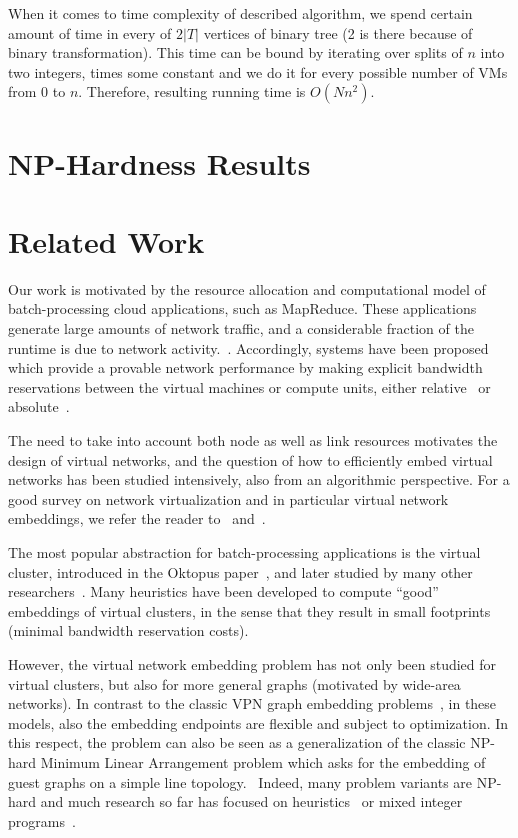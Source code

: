 \documentclass[9pt,twocolumn]{scrartcl}
\begin{document}
When it comes to time complexity of described algorithm, we spend
certain amount of time in every of $2|T|$ vertices of binary
tree (2 is there because of binary transformation). This time can be
bound by iterating over splits of $n$ into two integers, times some
constant and we do it for every possible number of VMs from $0$ to $n$. Therefore, resulting running time is $O(Nn^2)$.



\section{NP-Hardness Results}\label{sec:np}




\section{Related Work}\label{sec:relwork}

Our work is motivated by the resource allocation and computational model of
batch-processing cloud applications, such as MapReduce.
These applications
generate large amounts of network traffic, and a considerable
fraction of the runtime is due to network acti\-vi\-ty.~\cite{talk-about,amazonbw,orchestra}.
Accordingly, systems have been proposed which provide
a provable network performance by making explicit bandwidth reservations
between the virtual machines or compute units, either relative~\cite{seawall,faircloud,elasticswitch}
or absolute~\cite{secondnet,oktopus, proteus, drl, gatekeeper}.

The need to take into account both node as well as link resources motivates
the design of virtual networks, and the question of how to efficiently embed virtual networks
has been studied intensively, also from an algorithmic perspective.
For a good survey on network virtualization and in particular virtual network embeddings,
we refer the reader to~\cite{boutaba-survey} and~\cite{fischer-survey}.

The most popular abstraction for batch-processing applications is the virtual cluster,
introduced in the Oktopus paper~\cite{oktopus}, and later studied by many other researchers~\cite{proteus}.
Many heuristics have been developed to compute ``good'' embeddings of virtual clusters, in the sense that
they result in small footprints (minimal bandwidth reservation costs).

However, the virtual network embedding problem has not only been studied for virtual clusters,
but also for more general graphs (motivated by wide-area networks). In contrast to the classic VPN
graph embedding problems~\cite{gupta2001provisioning,Goyal2008},
in these models, also the embedding endpoints are flexible and subject to optimization.
In this respect, the problem can also be seen as a generalization of the classic NP-hard Minimum Linear Arrangement problem which asks for the
embedding of guest graphs on a simple line topology.~\cite{mla,mla-survey,mla-feige}
Indeed, many problem variants are NP-hard and much research so far has focused on heuristics~\cite{ammar,zhu06,simannealing,turner}
or mixed integer programs~\cite{infocom2009,ucc12mip}.
\end{document}
